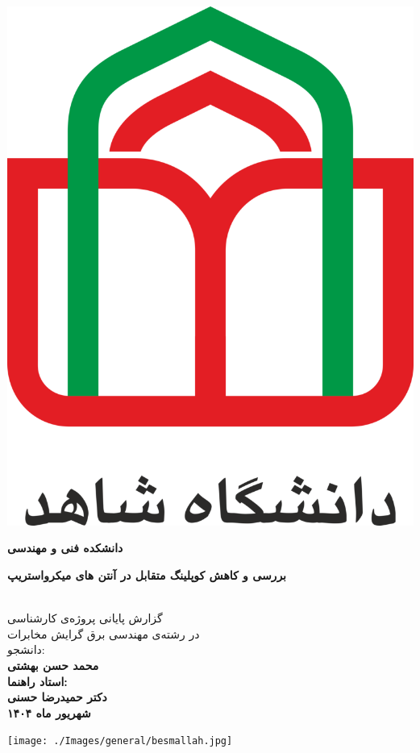
\thispagestyle{empty}
\vspace*{-28mm}
\centerline{\includegraphics[scale=0.1]{./Images/general/logo.png}}
\begin{center}
\vspace{-1mm}
\textbf{دانشکده فنی و مهندسی}
\\[3cm]
\begin{Huge}
\textbf{
بررسی و کاهش کوپلینگ متقابل در آنتن های میکرواستریپ
}
\end{Huge}
\\[1.5cm]
\Large
گزارش پایانی پروژه‌ی کارشناسی
\\[0.25cm]
در رشته‌ی مهندسی برق گرایش مخابرات
\\[3cm]
دانشجو:
\\[0.25cm]
\textbf{
محمد حسن بهشتی    
\\[1cm]
استاد راهنما:
\\[0.25cm]
دکتر حمیدرضا حسنی
\\[1cm]
شهریور ماه ۱۴۰۴
}
\end{center}
\newpage
\thispagestyle{empty}
\centerline{\texttt{[image: ./Images/general/besmallah.jpg]}}

